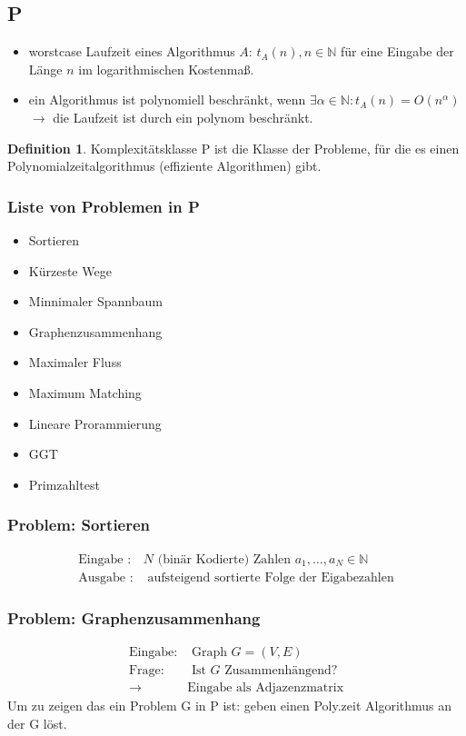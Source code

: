 \documentclass[a4paper, 10pt]{article}
\theoremstyle{definition}
\newtheorem{definition}{Definition}[section]
\begin{document}
\subsection{P}
\begin{itemize}
    \item worstcase Laufzeit eines Algorithmus $A$: $t_A(n),n\in\mathbb{N}$ für eine Eingabe der Länge $n$ im logarithmischen Kostenmaß.
    \item ein Algorithmus ist polynomiell beschränkt, wenn $\exists\alpha\in\mathbb{N}:t_A(n)=O(n^\alpha)$\\$\to$ die Laufzeit ist durch ein polynom beschränkt.
\end{itemize}
\begin{definition}{Komplexitätsklasse P} ist die Klasse der Probleme, für die es einen Polynomialzeitalgorithmus (effiziente Algorithmen) gibt.
\end{definition}
\subsubsection{Liste von Problemen in P}
\begin{itemize}
    \item Sortieren 
    \item Kürzeste Wege
    \item Minnimaler Spannbaum
    \item Graphenzusammenhang
    \item Maximaler Fluss
    \item Maximum Matching
    \item Lineare Prorammierung
    \item GGT
    \item Primzahltest
\end{itemize}
\subsubsection{Problem: Sortieren}
\begin{align*}
    \text{Eingabe }:& N\text{ (binär Kodierte) Zahlen }a_1,\dots,a_N\in\mathbb{N}\\
    \text{Ausgabe }:& \text{ aufsteigend sortierte Folge der Eigabezahlen}
\end{align*}
\subsubsection{Problem: Graphenzusammenhang}
\begin{align*}
    \text{Eingabe:}&\text{ Graph }G=(V,E)\\
    \text{Frage:}&\text{ Ist $G$ Zusammenhängend?}\\
    \to&\text{Eingabe als Adjazenzmatrix}
\end{align*}
Um zu zeigen das ein Problem G in P ist: geben einen Poly.zeit Algorithmus an der G löst.
\end{document}

